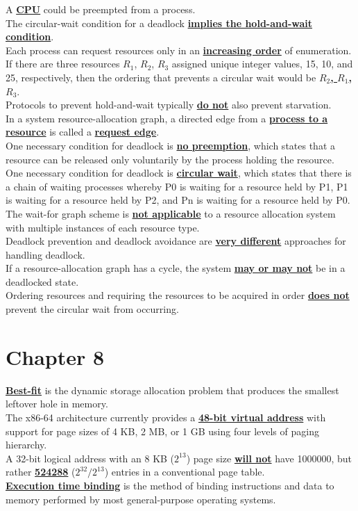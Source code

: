 \documentclass[10pt]{article}
\newcommand{\qw}[1]{\textbf{\ul{#1}}}
\begin{document}
A \qw{CPU} could be preempted from a process.\\[2mm]
The circular-wait condition for a deadlock \qw{implies the hold-and-wait condition}.\\[2mm]
Each process can request resources only in an \qw{increasing order} of enumeration. If there are three resources $R_1$, $R_2$, $R_3$ assigned unique integer values, 15, 10, and 25, respectively, then the ordering that prevents a circular wait would be \qw{$R_2$, $R_1$, $R_3$}.\\[2mm]
Protocols to prevent hold-and-wait typically \qw{do not} also prevent starvation.\\[2mm]
In a system resource-allocation graph, a directed edge from a \qw{process to a resource} is called a \qw{request edge}.\\[2mm]
One necessary condition for deadlock is \qw{no preemption}, which states that a resource can be released only voluntarily by the process holding the resource.\\[2mm]
One necessary condition for deadlock is \qw{circular wait}, which states that there is a chain of waiting processes whereby P0 is waiting for a resource held by P1, P1 is waiting for a resource held by P2, and Pn is waiting for a resource held by P0.\\[2mm]
The wait-for graph scheme is \qw{not applicable} to a resource allocation system with multiple instances of each resource type.\\[2mm]
Deadlock prevention and deadlock avoidance are \qw{very different} approaches for handling deadlock.\\[2mm]
If a resource-allocation graph has a cycle, the system \qw{may or may not} be in a deadlocked state.\\[2mm]
Ordering resources and requiring the resources to be acquired in order \qw{does not} prevent the circular wait from occurring.
\newpage



\section*{\centering Chapter 8}
\qw{Best-fit} is the dynamic storage allocation problem that produces the smallest leftover hole in memory.\\[2mm]
The x86-64 architecture currently provides a \qw{48-bit virtual address} with support for page sizes of 4 KB, 2 MB, or 1 GB using four levels of paging hierarchy.\\[2mm]
A 32-bit logical address with an 8 KB ($2^{13}$) page size \qw{will not} have 1000000, but rather \qw{524288} ($2^{32}/2^{13}$) entries in a conventional page table.\\[2mm]
\qw{Execution time binding} is the method of binding instructions and data to memory performed by most general-purpose operating systems.\\[2mm]
\newpage
\end{document}
